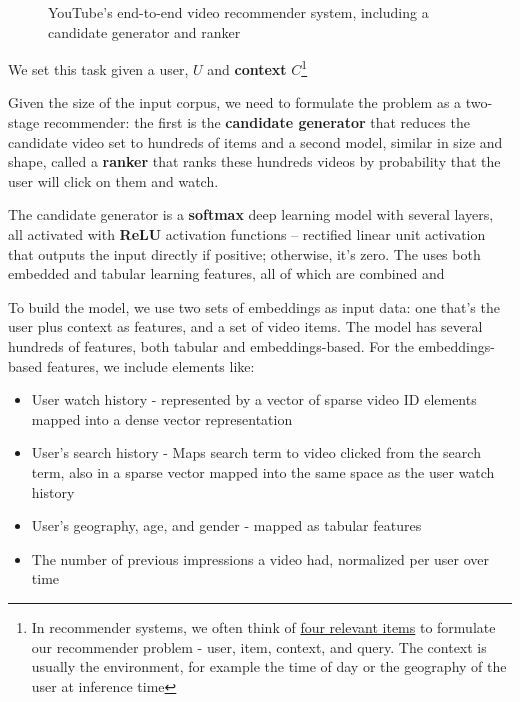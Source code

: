 \documentclass[11pt, table]{diazessay} %
\begin{document}
\begin{sloppypar}
\begin{figure}[H]
\caption{YouTube's end-to-end video recommender system, including a candidate generator and ranker \citep{covington2016deep}}
\end{figure}

We set this task given a user, $U$ and \textbf{context} $C$\footnote{In recommender systems, we often think of \href{https://md.ekstrandom.net/blog/2015/10/search-and-recsys}{four relevant items} to formulate our recommender problem - user, item, context, and query. The context is usually the environment, for example the time of day or the geography of the user at inference time }

Given the size of the input corpus, we need to formulate the problem as a two-stage recommender: the first is the \textbf{candidate generator} that reduces the candidate video set to hundreds of items and a second model, similar in size and shape, called a \textbf{ranker} that ranks these hundreds videos by probability that the user will click on them and watch.

The candidate generator is a \textbf{softmax} deep learning model with several layers, all activated with \textbf{ReLU} activation functions --  rectified linear unit activation that outputs the input directly if positive; otherwise, it's zero.  The uses both embedded and tabular learning features, all of which are combined and



To build the model, we use two sets of embeddings as input data: one that's the user plus context as features, and a set of video items. The model has several hundreds of features, both tabular and embeddings-based. For the embeddings-based features, we include elements like:

\begin{itemize}
  \item User watch history - represented by a vector of sparse video ID elements mapped into a dense vector representation
  \item User's search history - Maps search term to video clicked from the search term, also in a sparse vector mapped into the same space as the user watch history
  \item User's geography, age, and gender - mapped as tabular features
  \item The number of previous impressions a video had, normalized per user over time
\end{itemize}



\end{sloppypar}
\end{document}
